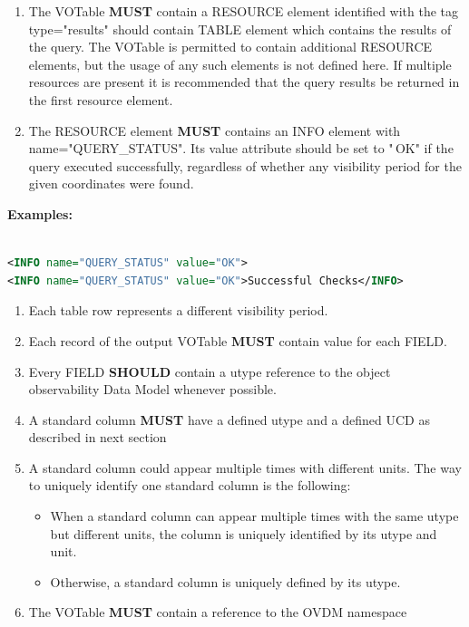 \documentclass[11pt,a4paper]{ivoatex/ivoa}
\begin{document}
\begin{enumerate}
\item The VOTable \textbf{MUST} contain a RESOURCE element identified
with the tag type="results" should contain TABLE element which contains
the results of the query. The VOTable is permitted to contain additional
RESOURCE elements, but the usage of any such elements is not defined
here. If multiple resources are present it is recommended that the query
results be returned in the first resource element.
\item The RESOURCE element \textbf{MUST} contains an INFO element with
name="QUERY\_STATUS". Its value attribute should be set to "\,OK" if the
query executed successfully, regardless of whether any visibility period
for the given coordinates were found.
\setcounter{numberedCntBI}{\theenumi}
\end{enumerate}

\textbf{Examples: }
\begin{lstlisting}[language=XML]

<INFO name="QUERY_STATUS" value="OK">
<INFO name="QUERY_STATUS" value="OK">Successful Checks</INFO>
\end{lstlisting}

\begin{enumerate}
\setcounter{enumi}{\thenumberedCntBI}
\item Each table row represents a different visibility period.
\item Each record of the output VOTable \textbf{MUST} contain value
for each FIELD.
\item Every FIELD \textbf{SHOULD} contain a utype reference to the
object observability Data Model whenever possible.
\item A standard column \textbf{MUST} have a defined utype and a
defined UCD as described in next section
\item A standard column could appear multiple times with different
units. The way to uniquely identify one standard column is the
following:
\begin{itemize}
\item When a standard column can appear multiple times with the same
utype but different units, the column is uniquely identified by its
utype and unit.
\item Otherwise, a standard column is uniquely defined by its utype.
\end{itemize}
\item The VOTable \textbf{MUST} contain a reference to the OVDM
namespace
\setcounter{numberedCntBI}{\theenumi}
\end{enumerate}
\end{document}
